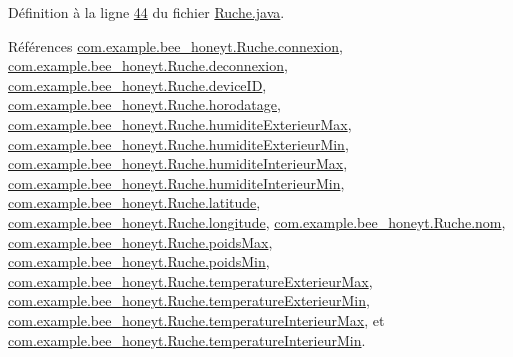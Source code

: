 Définition à la ligne \hyperlink{_ruche_8java_source_l00044}{44} du fichier \hyperlink{_ruche_8java_source}{Ruche.\+java}.



Références \hyperlink{_ruche_8java_source_l00021}{com.\+example.\+bee\+\_\+honeyt.\+Ruche.\+connexion}, \hyperlink{_ruche_8java_source_l00022}{com.\+example.\+bee\+\_\+honeyt.\+Ruche.\+deconnexion}, \hyperlink{_ruche_8java_source_l00019}{com.\+example.\+bee\+\_\+honeyt.\+Ruche.\+device\+ID}, \hyperlink{_ruche_8java_source_l00020}{com.\+example.\+bee\+\_\+honeyt.\+Ruche.\+horodatage}, \hyperlink{_ruche_8java_source_l00032}{com.\+example.\+bee\+\_\+honeyt.\+Ruche.\+humidite\+Exterieur\+Max}, \hyperlink{_ruche_8java_source_l00031}{com.\+example.\+bee\+\_\+honeyt.\+Ruche.\+humidite\+Exterieur\+Min}, \hyperlink{_ruche_8java_source_l00030}{com.\+example.\+bee\+\_\+honeyt.\+Ruche.\+humidite\+Interieur\+Max}, \hyperlink{_ruche_8java_source_l00029}{com.\+example.\+bee\+\_\+honeyt.\+Ruche.\+humidite\+Interieur\+Min}, \hyperlink{_ruche_8java_source_l00036}{com.\+example.\+bee\+\_\+honeyt.\+Ruche.\+latitude}, \hyperlink{_ruche_8java_source_l00035}{com.\+example.\+bee\+\_\+honeyt.\+Ruche.\+longitude}, \hyperlink{_ruche_8java_source_l00018}{com.\+example.\+bee\+\_\+honeyt.\+Ruche.\+nom}, \hyperlink{_ruche_8java_source_l00034}{com.\+example.\+bee\+\_\+honeyt.\+Ruche.\+poids\+Max}, \hyperlink{_ruche_8java_source_l00033}{com.\+example.\+bee\+\_\+honeyt.\+Ruche.\+poids\+Min}, \hyperlink{_ruche_8java_source_l00028}{com.\+example.\+bee\+\_\+honeyt.\+Ruche.\+temperature\+Exterieur\+Max}, \hyperlink{_ruche_8java_source_l00027}{com.\+example.\+bee\+\_\+honeyt.\+Ruche.\+temperature\+Exterieur\+Min}, \hyperlink{_ruche_8java_source_l00026}{com.\+example.\+bee\+\_\+honeyt.\+Ruche.\+temperature\+Interieur\+Max}, et \hyperlink{_ruche_8java_source_l00025}{com.\+example.\+bee\+\_\+honeyt.\+Ruche.\+temperature\+Interieur\+Min}.


